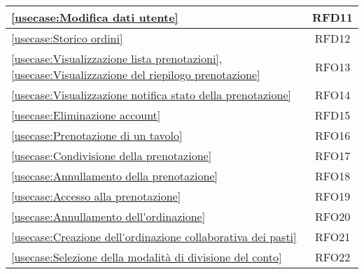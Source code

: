 \begin{longtable}{|l|c|}
	\hline
	\autoref{usecase:Modifica dati utente}                                                                                                                       & RFD11                  \\
	\hline
	\autoref{usecase:Storico ordini}                                                                                                                             & RFD12                  \\
	\hline
	\autoref{usecase:Visualizzazione lista prenotazioni}, \autoref{usecase:Visualizzazione del riepilogo prenotazione}                                           & RFO13                  \\
	\hline
	\autoref{usecase:Visualizzazione notifica stato della prenotazione}                                                                                          & RFO14                  \\
	\hline
	\autoref{usecase:Eliminazione account}                                                                                                                       & RFD15                  \\
	\hline
	\autoref{usecase:Prenotazione di un tavolo}                                                                                                                  & RFO16                  \\
	\hline
	\autoref{usecase:Condivisione della prenotazione}                                                                                                            & RFO17                  \\
	\hline
	\autoref{usecase:Annullamento della prenotazione}                                                                                                            & RFO18                  \\
	\hline
	\autoref{usecase:Accesso alla prenotazione}                                                                                                                  & RFO19                  \\
	\hline
	\autoref{usecase:Annullamento dell'ordinazione}                                                                                                              & RFO20                  \\
	\hline
	\autoref{usecase:Creazione dell'ordinazione collaborativa dei pasti}                                                                                         & RFO21                  \\
	\hline
	\autoref{usecase:Selezione della modalità di divisione del conto}                                                                                            & RFO22                  \\

\end{longtable}
